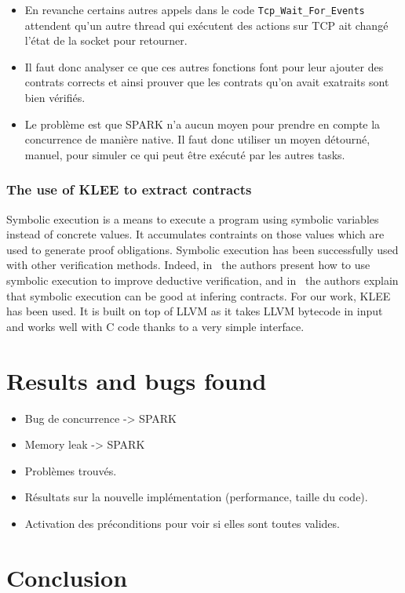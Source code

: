 \documentclass[runningheads]{llncs}
\begin{document}
    \begin{itemize}
        \item En revanche certains autres appels dans le code \lstinline{Tcp_Wait_For_Events} attendent qu'un autre thread qui exécutent des actions sur TCP ait changé l'état de la socket pour retourner.
        \item Il faut donc analyser ce que ces autres fonctions font pour leur ajouter des contrats corrects et ainsi prouver que les contrats qu'on avait exatraits sont bien vérifiés.
        \item Le problème est que SPARK n'a aucun moyen pour prendre en compte la concurrence de manière native. Il faut donc utiliser un moyen détourné, manuel, pour simuler ce qui peut être exécuté par les autres tasks.
    \end{itemize}

\subsubsection{The use of KLEE to extract contracts}

    Symbolic execution is a means to execute a program using symbolic variables instead of concrete values. It accumulates contraints
    on those values which are used to generate proof obligations. Symbolic execution has been successfully used with other verification
    methods. Indeed, in~\cite{vanoverberghe2008using} the authors present how to use symbolic execution to improve deductive verification,
    and in~\cite{kassios2012comparing} the authors explain that symbolic execution can be good at infering contracts.
    For our work, KLEE has been used. It is built on top of LLVM as it takes LLVM bytecode in input
    and works well with C code thanks to a very simple interface.

\section{Results and bugs found}

    \begin{itemize}
        \item Bug de concurrence -> SPARK
        \item Memory leak -> SPARK
        \item Problèmes trouvés.
        \item Résultats sur la nouvelle implémentation (performance, taille du code).
        \item Activation des préconditions pour voir si elles sont toutes valides.
    \end{itemize}



\section{Conclusion}




\end{document}
